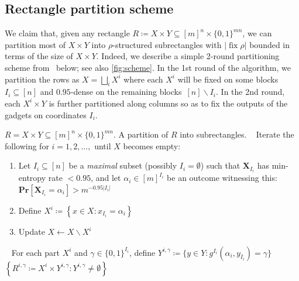 \documentclass{toc}
\renewcommand{\Pr}{\mathbf{Pr}}
\DeclareMathOperator{\fix}{fix}
\newcommand{\X}{\bm{X}}
\newcommand{\allX}{[m]^n}
\newcommand{\allY}{\{0,1\}^{mn}}
\newcommand{\set}[1]{\left \{ #1 \right \}}
\newcommand{\bit}{\{0,1\}}
\begin{document}
\subsection{Rectangle partition scheme}

We claim that, given any rectangle $R \coloneqq X\times Y\subseteq \allX\times\allY$, we can partition most of $X\times Y$ into $\rho$-structured subrectangles with $|\!\fix\rho|$ bounded in terms of the size of $X\times Y$. Indeed, we describe a simple 2-round partitioning scheme from~\cite{goos17bpp} below; see also \autoref{fig:scheme}. In the 1st round of the algorithm, we partition the rows as $X=\bigsqcup_i X^i$ where each $X^i$ will be fixed on some blocks $I_i\subseteq[n]$ and $0.95$-dense on the remaining blocks~$[n]\smallsetminus I_i$. In the 2nd round, each $X^i\times Y$ is further partitioned along columns so as to fix the outputs of the gadgets on coordinates $I_i$.

\vspace{1mm}

\begin{algorithm}[ht]
	\begin{algorithmic}[1]
		\vspace{1mm}
		\Input $R = X \times Y \subseteq \allX \times \allY$.
		\Output A partition of $R$ into subrectangles.
		\vspace{2mm}
		~ Iterate the following for $i=1,2,\ldots,$ until $X$ becomes empty:
	\begin{enumerate}[label=(\roman*),topsep=1mm]
		\item Let $I_i\subseteq [n]$ be a \emph{maximal} subset (possibly $I_i=\emptyset$) such that $\X_{I_i}$ has min-entropy rate $<0.95$, and let $\alpha_i\in[m]^{I_i}$ be an outcome witnessing this: $\Pr[\X_{I_i}=\alpha_i]>m^{-0.95|I_i|}$
		\item Define $X^i \coloneqq \set{x \in X: x_{I_i}=\alpha_i}$
		\item Update $X \gets X \smallsetminus X^i$
	\end{enumerate}
\vspace{1mm}
~ For each part $X^i$ and $\gamma \in \bit^{I_i}$, define $Y^{i,\gamma} \coloneqq \{ y \in Y : g^{I_i}(\alpha_i,y_{I_i})=\gamma\}$
\vspace{1mm}
\State \Return $\set{R^{i,\gamma} \coloneqq X^i \times Y^{i,\gamma} : Y^{i,\gamma} \ne \emptyset}$
	\end{algorithmic}
	\caption{\vspace{.5mm}}
	\label{alg:partition}
\end{algorithm}
\end{document}

